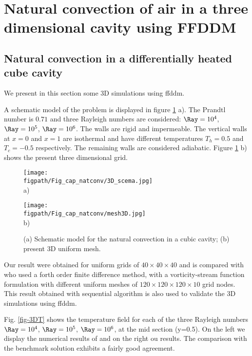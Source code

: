 \section{Natural convection of air in a three dimensional cavity using FFDDM}\label{sec: natconv-air-3D}

\subsection{Natural convection in a differentially heated cube cavity}
We present in this section some 3D simulations using ffddm.

A schematic model of the problem is displayed in figure \ref{fig-3Dmesh} a).
The Prandtl number is $0.71$ and three Rayleigh numbers are considered:  $\Ray=10^4$, $\Ray=10^5$, $\Ray=10^6$. The walls are rigid and impermeable. The vertical walls at $x=0$ and $x=1$ are isothermal and have different temperatures $T_h=0.5$ and $T_c=-0.5$ respectively. The remaining walls are considered adiabatic.  Figure \ref{fig-3Dmesh} b) shows the present three dimensional grid.
\begin{figure}%
\begin{minipage}{0.45\linewidth}
\begin{center}
 {\texttt{[image: \\figpath/Fig\_cap\_natconv/3D\_scema.jpg]}}\\
 a)
\end{center}
\end{minipage}\hfill
\begin{minipage}{0.45\linewidth}
\begin{center}
 {\texttt{[image: \\figpath/Fig\_cap\_natconv/mesh3D.jpg]}}\\
 b)
\end{center}
\end{minipage}
\caption{(a) Schematic model for the natural convection in a cubic cavity; (b) present 3D uniform mesh.}
\label{fig-3Dmesh}
\end{figure}
 
Our result were obtained for uniform grids of $  40 \times 40 \times 40$ and is compared with \cite{Wakashima-2004} who used a forth order finite difference method, with a vorticity-stream function formulation with different uniform meshes of  $120 \times 120 \times 120 \times 10$ grid nodes. 
This result obtained with sequential algorithm is also used to validate the 3D simulations using ffddm.

Fig. \ref{fig-3DT} shows the temperature field for each of the three Rayleigh numbers $\Ray = 10^4$, $\Ray = 10^5$, $\Ray = 10^6$, at the mid section (y=0.5).
On the left we display the numerical results of \cite{Wakashima-2004} and on the right ou results.
The comparison with the benchmark solution exhibits a fairly good agreement.

